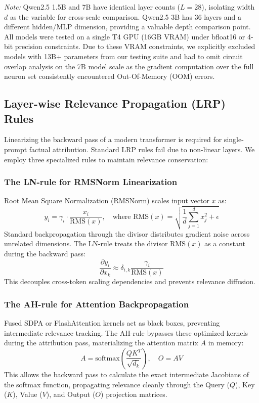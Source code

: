 \documentclass[11pt]{article}
\begin{document}
\textit{Note:} Qwen2.5 1.5B and 7B have identical layer counts ($L=28$), isolating width $d$ as the variable for cross-scale comparison. Qwen2.5 3B has 36 layers and a different hidden/MLP dimension, providing a valuable depth comparison point. All models were tested on a single T4 GPU (16GB VRAM) under bfloat16 or 4-bit precision constraints. Due to these VRAM constraints, we explicitly excluded models with 13B+ parameters from our testing suite and had to omit circuit overlap analysis on the 7B model scale as the gradient computation over the full neuron set consistently encountered Out-Of-Memory (OOM) errors.

\subsection{Layer-wise Relevance Propagation (LRP) Rules}

Linearizing the backward pass of a modern transformer is required for single-prompt factual attribution. Standard LRP rules fail due to non-linear layers. We employ three specialized rules to maintain relevance conservation:

\subsubsection{The LN-rule for RMSNorm Linearization}
Root Mean Square Normalization (RMSNorm) scales input vector $x$ as:
\begin{equation}
y_i = \gamma_i \cdot \frac{x_i}{\text{RMS}(x)}, \quad \text{where } \text{RMS}(x) = \sqrt{\frac{1}{d} \sum_{j=1}^d x_j^2 + \epsilon}
\end{equation}
Standard backpropagation through the divisor distributes gradient noise across unrelated dimensions. The LN-rule treats the divisor $\text{RMS}(x)$ as a constant during the backward pass:
\begin{equation}
\frac{\partial y_i}{\partial x_k} \approx \delta_{i,k} \frac{\gamma_i}{\text{RMS}(x)}
\end{equation}
This decouples cross-token scaling dependencies and prevents relevance diffusion.

\subsubsection{The AH-rule for Attention Backpropagation}
Fused SDPA or FlashAttention kernels act as black boxes, preventing intermediate relevance tracking. The AH-rule bypasses these optimized kernels during the attribution pass, materializing the attention matrix $A$ in memory:
\begin{equation}
A = \text{softmax}\left(\frac{Q K^T}{\sqrt{d_k}}\right), \quad O = A V
\end{equation}
This allows the backward pass to calculate the exact intermediate Jacobians of the softmax function, propagating relevance cleanly through the Query ($Q$), Key ($K$), Value ($V$), and Output ($O$) projection matrices.
\end{document}
